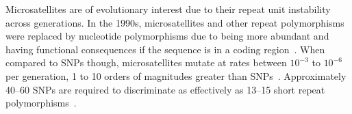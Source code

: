 Microsatellites are of evolutionary interest due to their repeat unit instability across generations.
In the 1990s, microsatellites and other repeat polymorphisms were replaced by nucleotide polymorphisms due to being
more abundant and having functional consequences if the sequence is in a coding
region~\cite{graySingleNucleotidePolymorphisms2000}.
When compared to SNPs though, microsatellites mutate at rates between $10^{-3}$ to $10^{-6}$ per generation,
1 to 10 orders of magnitudes greater than SNPs~\cite{gemayelJunkVariableTandemRepeats2012}.
Approximately 40--60 SNPs are required to discriminate as effectively as 13--15 short repeat
polymorphisms~\cite{butlerSTRsVsSNPs2007}.
